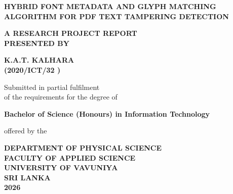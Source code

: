 \begin{center}
\onehalfspacing
\MakeUppercase{\textbf{\large HYBRID FONT METADATA AND GLYPH MATCHING Algorithm FOR PDF TEXT TAMPERING DETECTION}}

\vspace{1.5in}

\MakeUppercase{\textbf{A Research Project Report\\Presented by}}

\vspace{0.6in}

\MakeUppercase{\textbf{K.A.T. Kalhara\\(2020/ICT/32 )}}

\vspace{1.5in}

Submitted in partial fulfilment\\
of the requirements for the degree of

\vspace{0.6in}

\textbf{Bachelor of Science (Honours) in Information Technology}

\vspace{0.5in}

offered by the

\vspace{1.05in}

\textbf{DEPARTMENT OF PHYSICAL SCIENCE\\
FACULTY OF APPLIED SCIENCE\\
UNIVERSITY OF VAVUNIYA\\
SRI LANKA\\
2026
}
\end{center} 